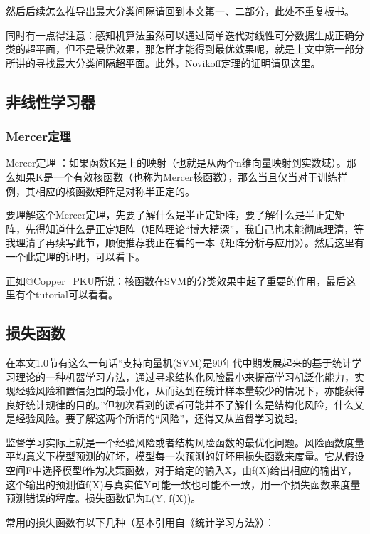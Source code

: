 \documentclass[a4paper,12pt]{article}
\begin{document}
然后后续怎么推导出最大分类间隔请回到本文第一、二部分，此处不重复板书。

同时有一点得注意：感知机算法虽然可以通过简单迭代对线性可分数据生成正确分类的超平面，但不是最优效果，那怎样才能得到最优效果呢，就是上文中第一部分所讲的寻找最大分类间隔超平面。此外，Novikoff定理的证明请见这里。

\subsection{非线性学习器}
\subsubsection{Mercer定理}
Mercer定理 ：如果函数K是上的映射（也就是从两个n维向量映射到实数域）。那么如果K是一个有效核函数（也称为Mercer核函数），那么当且仅当对于训练样例，其相应的核函数矩阵是对称半正定的。 

要理解这个Mercer定理，先要了解什么是半正定矩阵，要了解什么是半正定矩阵，先得知道什么是正定矩阵（矩阵理论“博大精深”，我自己也未能彻底理清，等我理清了再续写此节，顺便推荐我正在看的一本《矩阵分析与应用》）。然后这里有一个此定理的证明，可以看下。

正如@Copper\_PKU所说：核函数在SVM的分类效果中起了重要的作用，最后这里有个tutorial可以看看。

\subsection{损失函数}
在本文1.0节有这么一句话“支持向量机(SVM)是90年代中期发展起来的基于统计学习理论的一种机器学习方法，通过寻求结构化风险最小来提高学习机泛化能力，实现经验风险和置信范围的最小化，从而达到在统计样本量较少的情况下，亦能获得良好统计规律的目的。”但初次看到的读者可能并不了解什么是结构化风险，什么又是经验风险。要了解这两个所谓的“风险”，还得又从监督学习说起。

监督学习实际上就是一个经验风险或者结构风险函数的最优化问题。风险函数度量平均意义下模型预测的好坏，模型每一次预测的好坏用损失函数来度量。它从假设空间F中选择模型f作为决策函数，对于给定的输入X，由f(X)给出相应的输出Y，这个输出的预测值f(X)与真实值Y可能一致也可能不一致，用一个损失函数来度量预测错误的程度。损失函数记为L(Y, f(X))。


常用的损失函数有以下几种（基本引用自《统计学习方法》）：
\end{document}
